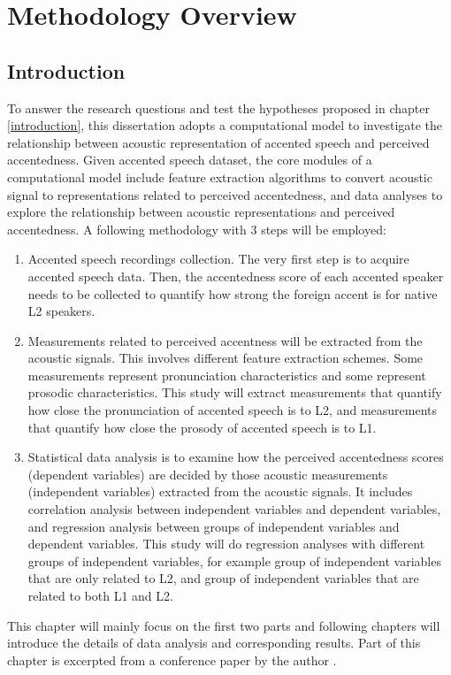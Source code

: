 \chapter{Methodology Overview}
\label{sec:methodology}
\section{Introduction}
To answer the research questions and test the hypotheses proposed in chapter \ref{introduction}, this dissertation adopts a computational model to investigate the relationship between acoustic representation of accented speech and perceived accentedness. Given accented speech dataset, the core modules of a computational model include feature extraction algorithms to convert acoustic signal to representations related to perceived accentedness, and data analyses to explore the relationship between acoustic representations and perceived accentedness. A following methodology with 3 steps will be employed:
\begin{enumerate}
\item Accented speech recordings collection. The very first step is to acquire accented speech data. Then, the accentedness score of each accented speaker needs to be collected to quantify how strong the foreign accent is for native L2 speakers.
\item Measurements related to perceived accentness will be extracted from the acoustic signals. This involves different feature extraction schemes. Some measurements represent pronunciation characteristics and some represent prosodic characteristics. This study will extract measurements that quantify how close the pronunciation of accented speech is to L2, and measurements that quantify how close the prosody of accented speech is to L1.
\item Statistical data analysis is to examine how the perceived accentedness scores (dependent variables) are decided by those acoustic measurements (independent variables) extracted from the acoustic signals. It includes correlation analysis between independent variables and dependent variables, and regression analysis between groups of independent variables and dependent variables. This study will do regression analyses with different groups of independent variables, for example group of independent variables that are only related to L2, and group of independent variables that are related to both L1 and L2.
\end{enumerate}
This chapter will mainly focus on the first two parts and following chapters will introduce the details of data analysis and corresponding results. Part of this chapter is excerpted from a conference paper by the author \citep{tu2018investigating}.

